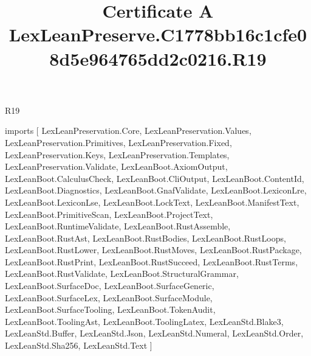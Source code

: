 \begin{lexlean}{R19}
\title{Certificate A LexLeanPreserve.C1778bb16c1cfe08d5e964765dd2c0216.R19}
\begin{coremodule}
imports [
  LexLeanPreservation.Core,
  LexLeanPreservation.Values,
  LexLeanPreservation.Primitives,
  LexLeanPreservation.Fixed,
  LexLeanPreservation.Keys,
  LexLeanPreservation.Templates,
  LexLeanPreservation.Validate,
  LexLeanBoot.AxiomOutput,
  LexLeanBoot.CalculusCheck,
  LexLeanBoot.CliOutput,
  LexLeanBoot.ContentId,
  LexLeanBoot.Diagnostics,
  LexLeanBoot.GnafValidate,
  LexLeanBoot.LexiconLre,
  LexLeanBoot.LexiconLse,
  LexLeanBoot.LockText,
  LexLeanBoot.ManifestText,
  LexLeanBoot.PrimitiveScan,
  LexLeanBoot.ProjectText,
  LexLeanBoot.RuntimeValidate,
  LexLeanBoot.RustAssemble,
  LexLeanBoot.RustAst,
  LexLeanBoot.RustBodies,
  LexLeanBoot.RustLoops,
  LexLeanBoot.RustLower,
  LexLeanBoot.RustMoves,
  LexLeanBoot.RustPackage,
  LexLeanBoot.RustPrint,
  LexLeanBoot.RustSucceed,
  LexLeanBoot.RustTerms,
  LexLeanBoot.RustValidate,
  LexLeanBoot.StructuralGrammar,
  LexLeanBoot.SurfaceDoc,
  LexLeanBoot.SurfaceGeneric,
  LexLeanBoot.SurfaceLex,
  LexLeanBoot.SurfaceModule,
  LexLeanBoot.SurfaceTooling,
  LexLeanBoot.TokenAudit,
  LexLeanBoot.ToolingAst,
  LexLeanBoot.ToolingLatex,
  LexLeanStd.Blake3,
  LexLeanStd.Buffer,
  LexLeanStd.Json,
  LexLeanStd.Numeral,
  LexLeanStd.Order,
  LexLeanStd.Sha256,
  LexLeanStd.Text
]


\end{coremodule}
\end{lexlean}
